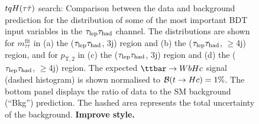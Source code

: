 \begin{figure}[t]
\begin{center}
\caption{$tqH(\tau\bar{\tau})$ search: Comparison between the data and background prediction for the distribution of some of the most
important BDT input variables in the $\tau_{\mathrm{lep}} \tau_{\mathrm{had}}$ channel. The distributions are shown for
$m_{\tau\tau}^{\text{fit}}$ in (a) the ($\tau_{\mathrm{lep}} \tau_{\mathrm{had}}$, 3j) region and (b) the ($\tau_{\mathrm{lep}} \tau_{\mathrm{had}}$, $\geq$4j) region, and for
$p_{\text{T},2}$ in (c) the ($\tau_{\mathrm{lep}} \tau_{\mathrm{had}}$, 3j)  region and (d) the ($\tau_{\mathrm{lep}} \tau_{\mathrm{had}}$, $\geq$4j) region.
The expected $\Hc$ signal (dashed histogram) is shown normalised to $\mathcal{B}(t\to Hc)=1\%$.
The bottom panel displays the ratio of data to the SM background (``Bkg'') prediction. 
The hashed area represents the total uncertainty of the background. \textbf{Improve style.}}
\label{fig:BDT_inputs_lephad}
\end{center}
\end{figure}

